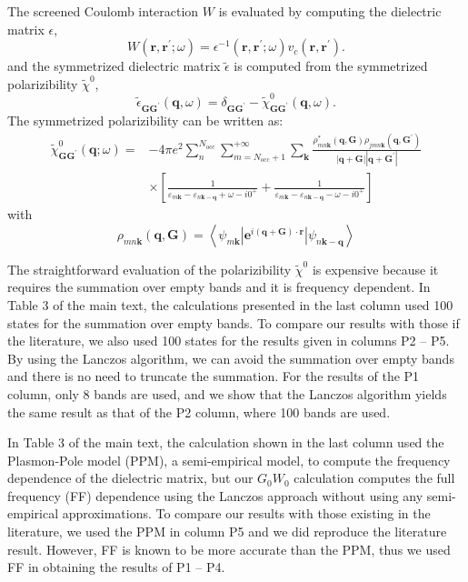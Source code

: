 \documentclass[journal=jctc,manuscript=article,preprint]{achemso}
\newcommand{\bfk}{{\mathbf{k}}}
\newcommand{\bfq}{{\mathbf{q}}}
\newcommand{\bfG}{{\mathbf{G}}}
\newcommand{\bfr}{{\mathbf{r}}}
\begin{document}
The screened Coulomb interaction $W$ is evaluated by computing  the dielectric matrix $\epsilon$,
\begin{equation}
    W(\bfr,\bfr^\prime;\omega) = \epsilon^{-1}(\bfr,\bfr^\prime;\omega)v_c(\bfr,\bfr^\prime).
\end{equation}
and the symmetrized dielectric matrix $\tilde{\epsilon}$ is computed from the symmetrized polarizibility $\tilde{\chi}^0$,
\begin{equation}
    \tilde{\epsilon}_{\bfG\bfG^\prime}(\bfq,\omega) = \delta_{\bfG\bfG^\prime} - \tilde{\chi}^0_{\bfG\bfG^\prime}(\bfq,\omega).
\end{equation}
The symmetrized polarizibility can be written as:
\begin{equation}
\begin{aligned}
    \tilde{\chi}^0_{\bfG\bfG^\prime}(\bfq;\omega) = & -4\pi e^2\sum_n^{N_\mathrm{occ}}\sum_{m=N_\mathrm{occ}+1}^{+\infty}\sum_\bfk  \frac{\rho^*_{mn\bfk}(\bfq,\bfG)\rho_{jmn\bfk}(\bfq,\bfG^\prime)}{|\bfq+\bfG||\bfq+\bfG^\prime|} \\
    & \times\left[ \frac{1}{\varepsilon_{m\bfk}-\varepsilon_{n\bfk-\bfq}+\omega-i0^+} + \frac{1}{\varepsilon_{m\bfk}-\varepsilon_{n\bfk-\bfq}-\omega-i0^+}
    \right]
\end{aligned}
\end{equation}
with
\begin{equation}
    \rho_{mn\bfk}(\bfq,\bfG) = \left\langle \psi_{m\bfk} \left| \mathbf{e}^{i(\bfq+\bfG)\cdot\bfr}\right|\psi_{n\bfk-\bfq}\right\rangle
\end{equation}

The straightforward evaluation of the polarizibility $\tilde{\chi}^0$ is expensive because it requires the summation over empty bands and it is frequency dependent. In Table 3 of the main text, the calculations presented in the last column used 100 states for  the summation over empty bands. To compare our results with those if the literature, we also used 100 states for the results given in columns P2 -- P5. By using the Lanczos algorithm, we can avoid the summation over empty bands and there is no need to truncate the summation. For the results of the P1 column, only 8 bands are used, and we show  that the Lanczos algorithm yields the same result as that of the P2 column, where 100 bands are used.

In Table 3 of the main text, the calculation shown in the last column used the Plasmon-Pole model (PPM),\cite{ppm1986} a semi-empirical model, to compute the frequency dependence of the dielectric matrix, but our $G_0W_0$ calculation computes the full frequency (FF) dependence using the Lanczos approach without using any semi-empirical approximations. To compare our results with those existing in the literature, we used the PPM in column P5 and we did reproduce the literature result. However, FF is known to be more accurate than the PPM,\cite{golze2019gw} thus we used FF in obtaining the results of P1 -- P4.
\end{document}
